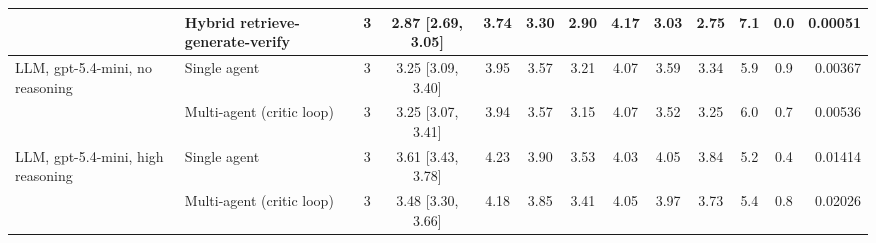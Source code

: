 \begin{table}[t]
{\begin{tabular}{llccccccccccr}
 & Hybrid retrieve-generate-verify & 3 & 2.87 [2.69, 3.05] & 3.74 & 3.30 & 2.90 & 4.17 & 3.03 & 2.75 & 7.1 & 0.0 & 0.00051 \\
\midrule
LLM, gpt-5.4-mini, no reasoning & Single agent & 3 & 3.25 [3.09, 3.40] & 3.95 & 3.57 & 3.21 & 4.07 & 3.59 & 3.34 & 5.9 & 0.9 & 0.00367 \\
 & Multi-agent (critic loop) & 3 & 3.25 [3.07, 3.41] & 3.94 & 3.57 & 3.15 & 4.07 & 3.52 & 3.25 & 6.0 & 0.7 & 0.00536 \\
\midrule
LLM, gpt-5.4-mini, high reasoning & Single agent & 3 & 3.61 [3.43, 3.78] & 4.23 & 3.90 & 3.53 & 4.03 & 4.05 & 3.84 & 5.2 & 0.4 & 0.01414 \\
 & Multi-agent (critic loop) & 3 & 3.48 [3.30, 3.66] & 4.18 & 3.85 & 3.41 & 4.05 & 3.97 & 3.73 & 5.4 & 0.8 & 0.02026 \\
\bottomrule
\end{tabular}}
\end{table}
